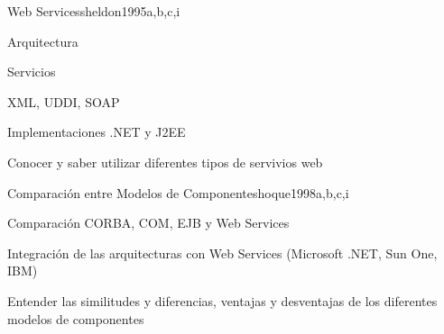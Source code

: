 \begin{syllabus}
\begin{unit}{Web Services}{sheldon1995}{a,b,c,i}
   \begin{topics}
      \item Arquitectura
      \item Servicios
      \item XML, UDDI, SOAP
      \item Implementaciones .NET y J2EE
   \end{topics}

   \begin{unitgoals}
      \item Conocer y saber utilizar diferentes tipos de servivios web
   \end{unitgoals}
\end{unit}

\begin{unit}{Comparación entre Modelos de Componentes}{hoque1998}{a,b,c,i}
   \begin{topics}
      \item Comparación CORBA, COM, EJB y Web Services
      \item Integración de las arquitecturas con Web Services (Microsoft .NET, Sun One, IBM)
   \end{topics}

   \begin{unitgoals}
      \item Entender las similitudes y diferencias, ventajas y desventajas de los diferentes modelos de componentes
   \end{unitgoals}
\end{unit}

\begin{coursebibliography}
\end{coursebibliography}
\end{syllabus}
